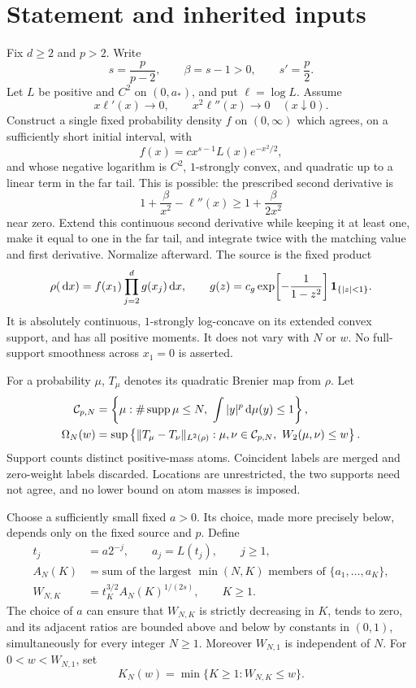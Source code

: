 \section{Statement and inherited inputs}
Fix $d\ge2$ and $p>2$. Write
\[
 s=\frac{p}{p-2},\qquad \beta=s-1>0,\qquad s'=\frac p2.
\]
Let $L$ be positive and $C^2$ on $(0,a_*)$, and put $\ell=\log L$. Assume
\begin{equation}
 x\ell'(x)\longrightarrow0,\qquad x^2\ell''(x)\longrightarrow0
 \quad(x\downarrow0).\tag{SV}
\end{equation}
Construct a single fixed probability density $f$ on $(0,\infty)$ which agrees, on a sufficiently short initial interval, with
\[
 f(x)=c x^{s-1}L(x)e^{-x^2/2},
\]
and whose negative logarithm is $C^2$, $1$-strongly convex, and quadratic up to a linear term in the far tail. This is possible: the prescribed second derivative is
\[
 1+\frac{\beta}{x^2}-\ell''(x)\ge1+\frac{\beta}{2x^2}
\]
near zero. Extend this continuous second derivative while keeping it at least one, make it equal to one in the far tail, and integrate twice with the matching value and first derivative. Normalize afterward. The source is the fixed product
\[
 \rho(\,\mathrm d x)=f(x_1)\prod_{j=2}^d g(x_j)\,\mathrm d x,
 \qquad g(z)=c_g\exp\!\left[-\frac1{1-z^2}\right]\mathbf 1_{\{|z|<1\}}.
\]
It is absolutely continuous, $1$-strongly log-concave on its extended convex support, and has all positive moments. It does not vary with $N$ or $w$. No full-support smoothness across $x_1=0$ is asserted.

For a probability $\mu$, $T_\mu$ denotes its quadratic Brenier map from $\rho$. Let
\begin{align*}
 \mathcal C_{p,N}&=\left\{\mu:\#\supp\mu\le N,\ \int|y|^p\dd\mu(y)\le1\right\},\\
 \Omega_N(w)&=\sup\left\{\norm{T_\mu-T_\nu}_{L^2(\rho)}:
 \mu,\nu\in\mathcal C_{p,N},\ W_2(\mu,\nu)\le w\right\}.
\end{align*}
Support counts distinct positive-mass atoms. Coincident labels are merged and zero-weight labels discarded. Locations are unrestricted, the two supports need not agree, and no lower bound on atom masses is imposed.

Choose a sufficiently small fixed $a>0$. Its choice, made more precisely below, depends only on the fixed source and $p$. Define
\begin{align*}
 t_j&=a2^{-j},\qquad a_j=L(t_j),\qquad j\ge1,\\
 A_N(K)&=\text{sum of the largest $\min(N,K)$ members of $\{a_1,\ldots,a_K\}$},\\
 W_{N,K}&=t_K^{3/2}A_N(K)^{1/(2s)},\qquad K\ge1.
\end{align*}
The choice of $a$ can ensure that $W_{N,K}$ is strictly decreasing in $K$, tends to zero, and its adjacent ratios are bounded above and below by constants in $(0,1)$, simultaneously for every integer $N\ge1$. Moreover $W_{N,1}$ is independent of $N$. For $0<w<W_{N,1}$, set
\[
 K_N(w)=\min\{K\ge1:W_{N,K}\le w\}.
\]
